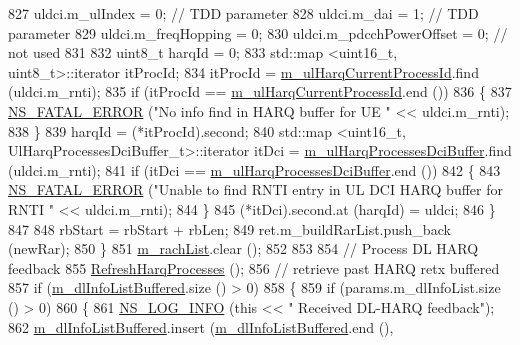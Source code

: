 \begin{DoxyCode}
827           uldci.m\_ulIndex = 0; \textcolor{comment}{// TDD parameter}
828           uldci.m\_dai = 1; \textcolor{comment}{// TDD parameter}
829           uldci.m\_freqHopping = 0;
830           uldci.m\_pdcchPowerOffset = 0; \textcolor{comment}{// not used}
831 
832           uint8\_t harqId = 0;
833           std::map <uint16\_t, uint8\_t>::iterator itProcId;
834           itProcId = \hyperlink{classns3_1_1TdTbfqFfMacScheduler_a418d37c6f77b19886fe25e71c103e8b1}{m\_ulHarqCurrentProcessId}.find (uldci.m\_rnti);
835           \textcolor{keywordflow}{if} (itProcId == \hyperlink{classns3_1_1TdTbfqFfMacScheduler_a418d37c6f77b19886fe25e71c103e8b1}{m\_ulHarqCurrentProcessId}.end ())
836             \{
837               \hyperlink{group__fatal_ga5131d5e3f75d7d4cbfd706ac456fdc85}{NS\_FATAL\_ERROR} (\textcolor{stringliteral}{"No info find in HARQ buffer for UE "} << uldci.m\_rnti);
838             \}
839           harqId = (*itProcId).second;
840           std::map <uint16\_t, UlHarqProcessesDciBuffer\_t>::iterator itDci = 
      \hyperlink{classns3_1_1TdTbfqFfMacScheduler_aa7b74d7f5898ae380db92cdd1205efae}{m\_ulHarqProcessesDciBuffer}.find (uldci.m\_rnti);
841           \textcolor{keywordflow}{if} (itDci == \hyperlink{classns3_1_1TdTbfqFfMacScheduler_aa7b74d7f5898ae380db92cdd1205efae}{m\_ulHarqProcessesDciBuffer}.end ())
842             \{
843               \hyperlink{group__fatal_ga5131d5e3f75d7d4cbfd706ac456fdc85}{NS\_FATAL\_ERROR} (\textcolor{stringliteral}{"Unable to find RNTI entry in UL DCI HARQ buffer for RNTI "} << 
      uldci.m\_rnti);
844             \}
845           (*itDci).second.at (harqId) = uldci;
846         \}
847 
848       rbStart = rbStart + rbLen;
849       ret.m\_buildRarList.push\_back (newRar);
850     \}
851   \hyperlink{classns3_1_1TdTbfqFfMacScheduler_a103dfe516b13e9ca8e0d1247c11b3679}{m\_rachList}.clear ();
852 
853 
854   \textcolor{comment}{// Process DL HARQ feedback}
855   \hyperlink{classns3_1_1TdTbfqFfMacScheduler_ae26f1cd58ab1221afdcd0fe4a1c04a11}{RefreshHarqProcesses} ();
856   \textcolor{comment}{// retrieve past HARQ retx buffered}
857   \textcolor{keywordflow}{if} (\hyperlink{classns3_1_1TdTbfqFfMacScheduler_aabf2460c78d16c5202cdcda020ba06dd}{m\_dlInfoListBuffered}.size () > 0)
858     \{
859       \textcolor{keywordflow}{if} (params.m\_dlInfoList.size () > 0)
860         \{
861           \hyperlink{group__logging_gafbd73ee2cf9f26b319f49086d8e860fb}{NS\_LOG\_INFO} (\textcolor{keyword}{this} << \textcolor{stringliteral}{" Received DL-HARQ feedback"});
862           \hyperlink{classns3_1_1TdTbfqFfMacScheduler_aabf2460c78d16c5202cdcda020ba06dd}{m\_dlInfoListBuffered}.insert (\hyperlink{classns3_1_1TdTbfqFfMacScheduler_aabf2460c78d16c5202cdcda020ba06dd}{m\_dlInfoListBuffered}.end (),

\end{DoxyCode}
